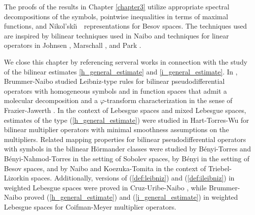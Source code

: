 The proofs of the results in Chapter \ref{chapter3} utilize appropriate spectral decompositions of the symbols, pointwise inequalities in terms of maximal functions, and Nikol'ski\u\i$\text{ }$  representations for Besov spaces. The techniques used are inspired by bilinear techniques used in Naibo \cite{MR3393696} and techniques for linear operators in Johnsen \citep{MR2163627}, Marschall \citep{MR1376592}, and Park \citep{Park}. 

We close this chapter by referencing serveral works in connection with the study of the bilinear estimates \eqref{h_general_estimate} and \eqref{i_general_estimate}. In \cite{MR3750234}, Brummer-Naibo studied Leibniz-type rules for bilinear pseudodifferential operators with homogeneous symbols and in function spaces that admit a molecular decomposition and a $\varphi$-transform characterization in the sense of Frazier-Jawerth \cite{MR808825, MR1070037}. In the context of Lebesgue spaces and mixed Lebesgue spaces, estimates of the type (\ref{h_general_estimate}) were studied in Hart-Torres-Wu \cite{MR3864388} for bilinear multiplier operators with minimal smoothness assumptions on the multipliers. Related mapping properties for bilinear pseudodifferential operators with symbols in the bilinear H\"ormander classes were studied by B\'enyi-Torres \cite{MR1986065} and B\'enyi-Nahmod-Torres \cite{MR2250054} in the setting of Sobolev spaces, by B\'enyi \cite{MR1996120} in the setting of Besov spaces, and by Naibo \cite{MR3393696} and Koezuka-Tomita \cite{MR3750316} in the context of Triebel-Lizorkin spaces. Additionally, versions of (\ref{def:leibniz}) and (\ref{def:ileibniz}) in weighted Lebesgue spaces were proved in Cruz-Uribe-Naibo \cite{MR3513582}, while Brummer-Naibo \cite{BrNa2017} proved (\ref{h_general_estimate}) and (\ref{i_general_estimate}) in weighted Lebesgue spaces for Coifman-Meyer multiplier operators. 


%
%
%


